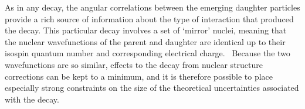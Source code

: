 As in any decay, the angular correlations between the emerging daughter particles provide a rich source of information about the type of interaction that produced the decay.  
This particular decay involves a set of `mirror' nuclei, meaning that the nuclear wavefunctions of the parent and daughter are identical up to their isospin quantum number and corresponding electrical charge.~ \noindent
Because the two wavefunctions are so similar, effects to the decay from nuclear structure corrections can be kept to a minimum, and it is therefore possible to place especially strong constraints on the size of the theoretical uncertainties associated with the decay.  






